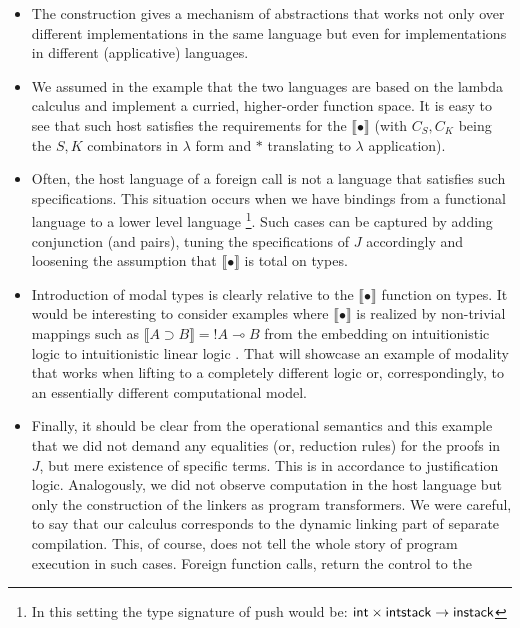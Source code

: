         \begin{itemize}
            \item The construction gives a mechanism of abstractions that works not only over different implementations in the
            same language but even for implementations in different (applicative) languages.
            \item We assumed in the example that the  two languages are based on the lambda calculus and implement a curried, higher-order function space. 
            It is easy to see that such host satisfies the requirements for the $\llbracket\bullet\rrbracket$ 
            (with $C_S, C_K$ being the $S, K$ combinators in $\lambda$ form  and $*$ translating to $\lambda$ application).
            \item
            Often, the host language of a foreign call is  not  a language that satisfies  such specifications. This situation occurs  when we have bindings from a functional language to a lower level language \footnote{In this setting the type signature of {\sf push} would be: $\mathtt{\sf int \times intstack\rightarrow instack}$}. 
            Such cases  can be captured by adding conjunction (and pairs), tuning the  specifications of $J$  accordingly and loosening the assumption that $\llbracket \bullet \rrbracket$
            is total on types.
            \item Introduction of  modal types is clearly relative to the $\llbracket\bullet \rrbracket$ function on types. 
            It would be interesting to consider examples where   $\llbracket\bullet \rrbracket$ is realized by non-trivial mappings such as $\llbracket A\supset B \rrbracket= !A \multimap B$
            from the embedding on intuitionistic logic to intuitionistic linear logic \cite{girard1987linear}.
            That will  showcase an example of   modality that works when lifting to a completely different logic or, correspondingly, to an essentially
            different computational model.
            \item Finally, it should be clear from the operational semantics and this example that we did not demand any equalities (or, reduction rules)  
            for the proofs in $J$, but mere existence of specific terms. This is in accordance to justification logic.  Analogously, we did not observe computation 
            in the host language but only the construction of the linkers as program transformers. We were careful, to say that our calculus corresponds to the dynamic 
            linking part of 
            separate compilation. This, of course, does not tell the whole story of program execution in such cases. Foreign function calls, return the control to the 

\end{itemize}

